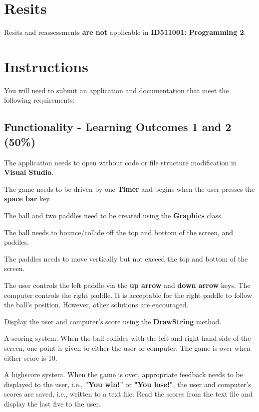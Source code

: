 \documentclass{article}
\begin{document}
\section*{Resits}
Resits and reassessments \textbf{are not} applicable in \textbf{ID511001: Programming 2}.

\section*{Instructions}
You will need to submit an application and documentation that meet the following requirements:\\

\subsection*{Functionality - Learning Outcomes 1 and 2 (50\%)}
    \item The application needs to open without code or file structure modification in \textbf{Visual Studio}.
    \item The game needs to be driven by one \textbf{Timer} and begins when the user presses the \textbf{space bar} key.
    \item The ball and two paddles need to be created using the \textbf{Graphics} class. 
    \item The ball needs to bounce/collide off the top and bottom of the screen, and paddles.
    \item The paddles needs to move vertically but not exceed the top and bottom of the screen.
    \item The user controls the left paddle via the \textbf{up arrow} and \textbf{down arrow} keys. The computer controls the right paddle. It is acceptable for the right paddle to follow the ball's position. However, other solutions are encouraged.
    \item Display the user and computer's score using the \textbf{DrawString} method.
    \item A scoring system. When the ball collides with the left and right-hand side of the screen, one point is given to either the user or computer. The game is over when either score is 10. 
    \item A highscore system. When the game is over, appropriate feedback needs to be displayed to the user, i.e., \textbf{"You win!"} or \textbf{"You lose!"}, the user and computer's scores are saved, i.e., written to a text file. Read the scores from the text file and display the last five to the user.
\end{document}
